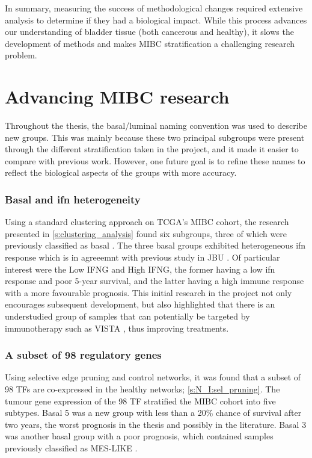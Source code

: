In summary, measuring the success of methodological changes required extensive analysis to determine if they had a biological impact. While this process advances our understanding of bladder tissue (both cancerous and healthy), it slows the development of methods and makes MIBC stratification a challenging research problem.

\section{Advancing MIBC research}

Throughout the thesis, the basal/luminal naming convention was used to describe new groups. This was mainly because these two principal subgroups were present through the different stratification taken in the project, and it made it easier to compare with previous work. However, one future goal is to refine these names to reflect the biological aspects of the groups with more accuracy.

\subsubsection*{Basal and \acrlong{ifn} heterogeneity}

Using a standard clustering approach on TCGA's MIBC cohort, the research presented in \cref{s:clustering_analysis} found six subgroups, three of which were previously classified as basal \citep{Kamoun2020-tj, Robertson2017-mg, Marzouka2018-ge}. The three basal groups exhibited heterogeneous \acrshort{ifn} response which is in agreeemnt with previous study in JBU \citep{Baker2022-bj}. Of particular interest were the Low IFNG and High IFNG, the former having a low \acrshort{ifn} response and poor 5-year survival, and the latter having a high immune response with a more favourable prognosis. This initial research in the project not only encourages subsequent development, but also highlighted that there is an understudied group of samples that can potentially be targeted by immunotherapy such as VISTA \citep{Baker2022-bj}, thus improving treatments.


\subsubsection*{A subset of 98 regulatory genes}

Using selective edge pruning and control networks, it was found that a subset of 98 TFs are co-expressed in the healthy networks; \cref{s:N_I:sel_pruning}. The tumour gene expression of the 98 TF stratified the MIBC cohort into five subtypes. Basal 5 was a new group with less than a 20\% chance of survival after two years, the worst prognosis in the thesis and possibly in the literature. Basal 3 was another basal group with a poor prognosis, which contained samples previously classified as \gls{MES-LIKE} \citep{Marzouka2018-ge}.

